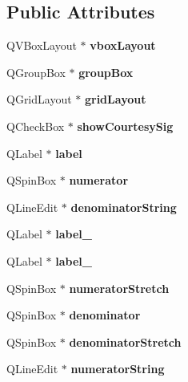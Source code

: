 \subsection*{Public Attributes}
\begin{DoxyCompactItemize}
\item 
\mbox{\label{class_ui___time_sig_aa9bb22012374ed4ffff5fbe467ea4513}} 
Q\+V\+Box\+Layout $\ast$ {\bfseries vbox\+Layout}
\item 
\mbox{\label{class_ui___time_sig_a08755d6eea34b27efa4543548898c960}} 
Q\+Group\+Box $\ast$ {\bfseries group\+Box}
\item 
\mbox{\label{class_ui___time_sig_ad327e0584c3c55613596d015c54ae8cc}} 
Q\+Grid\+Layout $\ast$ {\bfseries grid\+Layout}
\item 
\mbox{\label{class_ui___time_sig_a84ae78137eb619f2c655a46fec635abf}} 
Q\+Check\+Box $\ast$ {\bfseries show\+Courtesy\+Sig}
\item 
\mbox{\label{class_ui___time_sig_ac5aaea14afd0e3f21599dee46a872ff2}} 
Q\+Label $\ast$ {\bfseries label}
\item 
\mbox{\label{class_ui___time_sig_a0082e07228b783262b58f4f0d9fd1be5}} 
Q\+Spin\+Box $\ast$ {\bfseries numerator}
\item 
\mbox{\label{class_ui___time_sig_ada8f50aad7566989a741b45e927dbfab}} 
Q\+Line\+Edit $\ast$ {\bfseries denominator\+String}
\item 
\mbox{\label{class_ui___time_sig_a88764d9aa8afbf729dc4997d4b7278b9}} 
Q\+Label $\ast$ {\bfseries label\+\_}
\item 
\mbox{\label{class_ui___time_sig_abf34fa907a7945dfe86fd87eaf560761}} 
Q\+Label $\ast$ {\bfseries label\+\_}
\item 
\mbox{\label{class_ui___time_sig_ab7b8d707ed7581d4e7b5be1ac9f61170}} 
Q\+Spin\+Box $\ast$ {\bfseries numerator\+Stretch}
\item 
\mbox{\label{class_ui___time_sig_a077f8ff8bbfab7a3efa09290fe0f0c77}} 
Q\+Spin\+Box $\ast$ {\bfseries denominator}
\item 
\mbox{\label{class_ui___time_sig_a1acb1a73e26298be75b9f757812c8d47}} 
Q\+Spin\+Box $\ast$ {\bfseries denominator\+Stretch}
\item 
\mbox{\label{class_ui___time_sig_a2971172dee3d87103c6fe89b3419f4fe}} 
Q\+Line\+Edit $\ast$ {\bfseries numerator\+String}
\end{DoxyCompactItemize}


